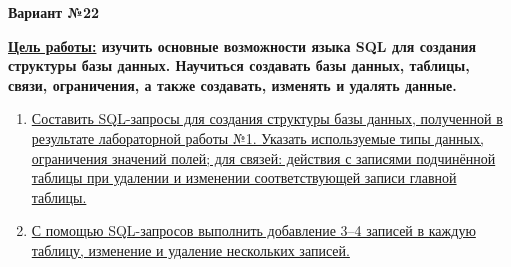     \begin{center}
        {\large \textbf{Вариант №22 \\
        }}
    \end{center}

    \textbf{\underline{Цель работы:} изучить основные возможности языка SQL для создания структуры базы данных. Научиться создавать базы данных, таблицы, связи, ограничения, а также создавать, изменять и удалять данные.
    } 

    \begin{enumerate}
        \item \hyperref[sec:1]{Составить SQL-запросы для создания структуры базы данных, полученной в результате лабораторной работы №1. Указать используемые типы данных, ограничения значений полей; для связей: действия с записями подчинённой таблицы при удалении и изменении соответствующей записи главной таблицы. }
        \item \hyperref[sec:2]{С помощью SQL-запросов выполнить добавление 3–4 записей в каждую таблицу, изменение и удаление нескольких записей.}
    \end{enumerate}